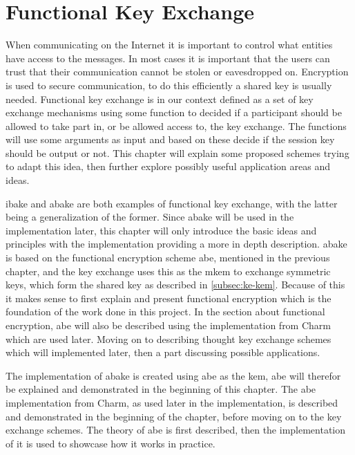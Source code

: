 \chapter{Functional Key Exchange}\label{chp:funckeyenc} 
When communicating on the Internet it is important to control what entities have access to the messages. In most cases it is important that the users can trust that their communication cannot be stolen or eavesdropped on. Encryption is used to secure communication, to do this efficiently a shared key is usually needed. Functional key exchange is in our context defined as a set of key exchange mechanisms using some function to decided if a participant should be allowed to take part in, or be allowed access to, the key exchange. The functions will use some arguments as input and based on these decide if the session key should be output or not. This chapter will explain some proposed schemes trying to adapt this idea, then further explore possibly useful application areas and ideas. 
\par \Gls{ibake} and \gls{abake} are both examples of functional key exchange, with the latter being a generalization of the former. Since \gls{abake} will be used in the implementation later, this chapter will only introduce the basic ideas and principles with the implementation providing a more in depth description.
\Gls{abake} is based on the functional encryption scheme \gls{abe}, mentioned in the previous chapter, and the key exchange uses this as the m\Gls{kem} to exchange symmetric keys, which form the shared key as described in \ref{subsec:ke-kem}. Because of this it makes sense to first explain and present functional encryption which is the foundation of the work done in this project. In the section about functional encryption, \gls{abe} will also be described using the implementation from Charm which are used later. Moving on to describing thought key exchange schemes which will implemented later, then a part discussing possible applications. 

 The implementation of \gls{abake} is created using \gls{abe} as the \gls{kem}, \gls{abe} will therefor be explained and demonstrated in the beginning of this chapter. The \gls{abe} implementation from Charm, as used later in the implementation, is described and demonstrated in the beginning of the chapter, before moving on to the key exchange schemes. The theory of \gls{abe} is first described, then the implementation of it is used to showcase how it works in practice. 


